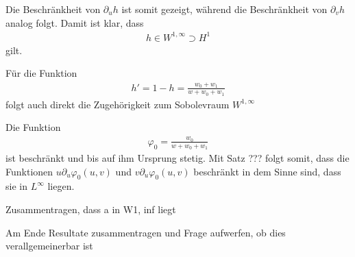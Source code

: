 \documentclass[10pt,a4paper,oneside]{report}
\begin{document}
Die Beschränkheit von $\partial_u h$ ist somit gezeigt, während die Beschränkheit von $\partial_v h$ analog folgt. 
Damit ist klar, dass
\begin{align*}
h \in W^{1, \infty} \supset H^1
\end{align*}
gilt.

Für die Funktion 
\begin{align*}
h' = 1 - h = \frac{w_0 + w_1}{w + w_0 +w_1}
\end{align*}
folgt auch direkt die Zugehörigkeit zum Sobolevraum $W^{1, \infty}$

Die Funktion 
\begin{align*}
\varphi_0 = \frac{w_0}{w + w_0 + w_1}
\end{align*}
ist beschränkt und bis auf ihm Ursprung stetig.
Mit Satz ??? folgt somit, dass die Funktionen $u \partial_u \varphi_0\left(u,v\right)$ und $v \partial_u \varphi_0\left(u,v\right)$ beschränkt in dem Sinne sind, dass sie in $L^{\infty}$ liegen.

Zusammentragen, dass
a in W1, inf liegt

Am Ende Resultate zusammentragen und Frage aufwerfen, ob dies verallgemeinerbar ist
\end{document}
